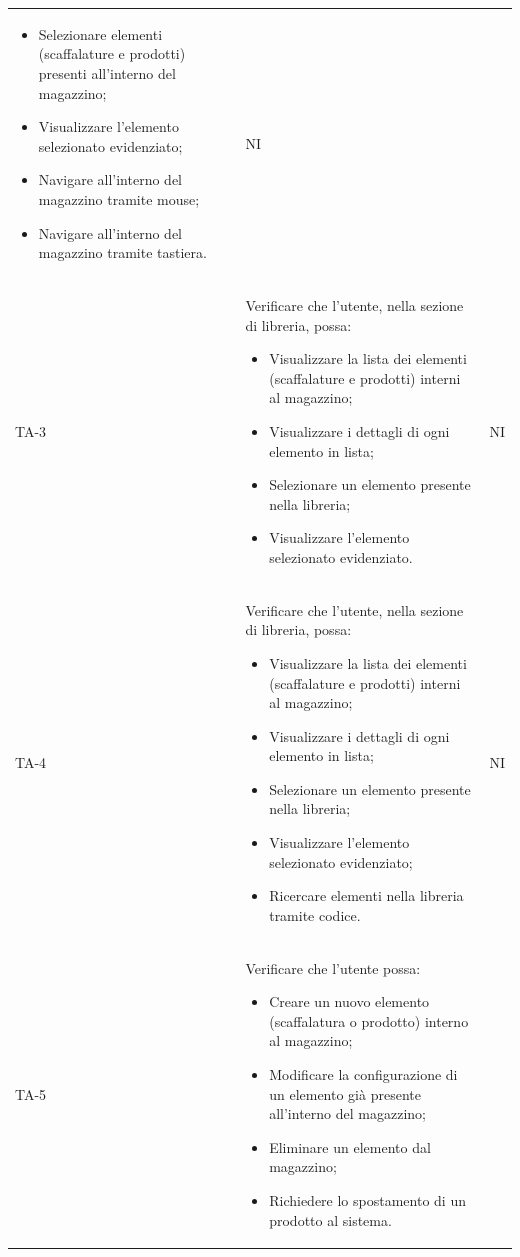 \begin{xltabular}{0.9\textwidth}{X | p{0.7\textwidth} | X}
\begin{itemize}
\begin{itemize}
        \end{itemize}
        \item Selezionare elementi (scaffalature e prodotti) presenti all'interno del magazzino;
        \item Visualizzare l'elemento selezionato evidenziato;
        \item Navigare all'interno del magazzino tramite mouse;
        \item Navigare all'interno del magazzino tramite tastiera.
    \end{itemize}
    & NI\\
    TA-3 & Verificare che l'utente, nella sezione di libreria, possa:
    \begin{itemize}
        \item Visualizzare la lista dei elementi (scaffalature e prodotti) interni al magazzino;
        \item Visualizzare i dettagli di ogni elemento in lista;
        \item Selezionare un elemento presente nella libreria;
        \item Visualizzare l'elemento selezionato evidenziato.
    \end{itemize}
    & NI \\
    TA-4 & Verificare che l'utente, nella sezione di libreria, possa:
    \begin{itemize}
        \item Visualizzare la lista dei elementi (scaffalature e prodotti) interni al magazzino;
        \item Visualizzare i dettagli di ogni elemento in lista;
        \item Selezionare un elemento presente nella libreria;
        \item Visualizzare l'elemento selezionato evidenziato;
        \item Ricercare elementi nella libreria tramite codice.
    \end{itemize}
    & NI \\
    TA-5 & Verificare che l'utente possa:
    \begin{itemize}
        \item Creare un nuovo elemento (scaffalatura o prodotto) interno al magazzino;
        \item Modificare la configurazione di un elemento già presente all'interno del magazzino;
        \item Eliminare un elemento dal magazzino;
        \item Richiedere lo spostamento di un prodotto al sistema.

\end{itemize}
\end{xltabular}
